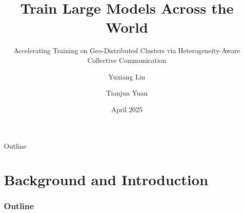 \documentclass{beamer}
\title[Geo-Distributed Training]{
    Train Large Models Across the World
}
\subtitle{Accelerating Training on Geo-Distributed Clusters via Heterogeneity-Aware Collective Communication}
\author{Yuxiang Lin \and Tianjun Yuan}
\institute{\{yl925, ty117\}@duke.edu}
\date{April 2025}
\begin{document}
\begin{frame}
  \titlepage
\end{frame}


\begin{frame}{Outline}
    \tableofcontents
\end{frame}

\section{Background and Introduction}
\begin{frame}
  \frametitle{Outline}
  \tableofcontents[currentsection]
\end{frame}



\end{document}
